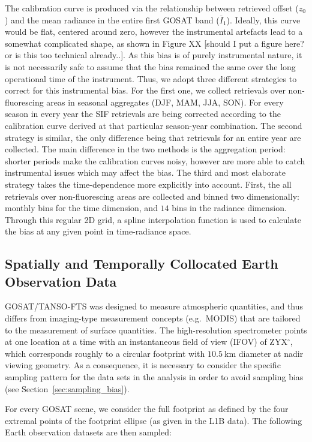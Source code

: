 \documentclass[preprint, a4paper, 10pt, times]{elsarticle}
\begin{document}
The calibration curve is produced via the relationship between retrieved offset ($z_0$) and the mean radiance in the entire first GOSAT band ($\overline{I}_1$). Ideally, this curve would be flat, centered around zero, however the instrumental artefacts lead to a somewhat complicated shape, as shown in Figure XX [should I put a figure here? or is this too technical already..]. As this bias is of purely instrumental nature, it is not necessarily safe to assume that the bias remained the same over the long operational time of the instrument. Thus, we adopt three different strategies to correct for this instrumental bias. For the first one, we collect retrievals over non-fluorescing areas in seasonal aggregates (DJF, MAM, JJA, SON). For every season in every year the SIF retrievals are being corrected according to the calibration curve derived at that particular season-year combination. The second strategy is similar, the only difference being that retrievals for an entire year are collected. The main difference in the two methods is the aggregation period: shorter periods make the calibration curves noisy, however are more able to catch instrumental issues which may affect the bias. The third and most elaborate strategy takes the time-dependence more explicitly into account. First, the all retrievals over non-fluorescing areas are collected and binned two dimensionally: monthly bins for the time dimension, and $14$ bins in the radiance dimension. Through this regular 2D grid, a spline interpolation function is used to calculate the bias at any given point in time-radiance space.  


\subsection{Spatially and Temporally Collocated Earth Observation Data}
\label{sec:collocation}

GOSAT/TANSO-FTS was designed to measure atmospheric quantities, and thus differs from imaging-type measurement concepts (e.g.~MODIS) that are tailored to the measurement of surface quantities. The high-resolution spectrometer points at one location at a time with an instantaneous field of view (IFOV) of ZYX$^\circ$, which corresponds roughly to a circular footprint with $10.5\:\mathrm{km}$ diameter at nadir viewing geometry. As a consequence, it is necessary to consider the specific sampling pattern for the data sets in the analysis in order to avoid sampling bias (see Section~\ref{sec:sampling_bias}).

For every GOSAT scene, we consider the full footprint as defined by the four extremal points of the footprint ellipse (as given in the L1B data). The following Earth observation datasets are then sampled:
\end{document}
